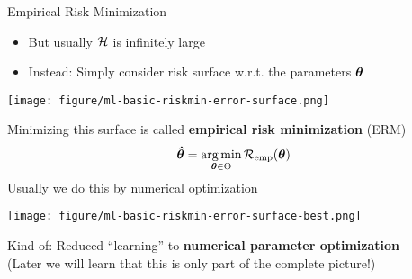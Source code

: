 \documentclass[11pt,compress,t,notes=noshow, xcolor=table]{beamer}
\begin{document}
\begin{vbframe}{Empirical Risk Minimization}

\begin{itemize}
    \item But usually $\mathcal{H}$ is infinitely large
    \item Instead: Simply consider risk surface w.r.t. the parameters $\bm{\theta}$ 
\end{itemize}

{
\texttt{[image: figure/ml-basic-riskmin-error-surface.png]}
}

\framebreak

Minimizing this surface is called \textbf{empirical risk minimization} (ERM)
$$
\bm{\hat\theta} = \mathop{\mathrm{arg\,min}}_{\bm{\theta} \in \Theta} \mathcal{R}_{\text{emp}}(\bm{\theta})
$$
Usually we do this by numerical optimization

{
\vspace{2em}
\texttt{[image: figure/ml-basic-riskmin-error-surface-best.png]}
}

\vfill

Kind of: 
Reduced ``learning'' to 
\textbf{numerical parameter optimization}\\
(Later we will learn that this is only part of the complete picture!)

\end{vbframe}

\endlecture
\end{document}
